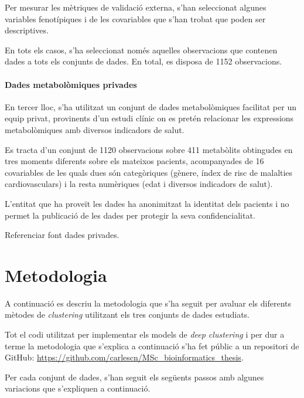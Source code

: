\documentclass[CAT,BIB]{TFUOC}%
\newcommand{\todo}[1]{
            \begin{tcolorbox}[title=ToDo!, colback=red!5!white, colframe=red!50!black, coltext=red!50!black]
            #1
            \end{tcolorbox}}
\begin{document}
        Per mesurar les mètriques de validació externa,
        s'han seleccionat algunes variables fenotípiques i de les covariables
        que s'han trobat que poden ser descriptives.

        En tots els casos,
        s'ha seleccionat només aquelles observacions
        que contenen dades a tots els conjunts de dades.
        En total, es disposa de 1152 observacions.

    \paragraph{Dades metabolòmiques privades}
        En tercer lloc, s'ha utilitzat un conjunt de dades metabolòmiques
        facilitat per un equip privat,
        provinents d'un estudi clínic
        on es pretén relacionar les expressions metabolòmiques
        amb diversos indicadors de salut.

        Es tracta d'un conjunt de 1120 observacions
        sobre 411 metabòlits
        obtingudes en tres moments diferents sobre els mateixos pacients,
        acompanyades de 16 covariables
        de les quals dues són categòriques
        (gènere, índex de risc de malalties cardiovasculars)
        i la resta numèriques
        (edat i diversos indicadors de salut).

        L'entitat que ha proveït les dades
        ha anonimitzat la identitat dels pacients
        i no permet la publicació de les dades
        per protegir la seva confidencialitat.

\todo{Referenciar font dades privades.}



    \section{Metodologia}
    \label{s:metodologia}

    A continuació es descriu la metodologia que s'ha seguit
    per avaluar els diferents mètodes de \textit{clustering}
    utilitzant els tres conjunts de dades estudiats.

    Tot el codi utilitzat per implementar els models de \textit{deep clustering}
    i per dur a terme la metodologia que s'explica a continuació
    s'ha fet públic a un repositori de GitHub:
    \url{https://github.com/carlescn/MSc_bioinformatics_thesis}.

    Per cada conjunt de dades,
    s'han seguit els següents passos
    amb algunes variacions que s'expliquen a continuació.
\end{document}
